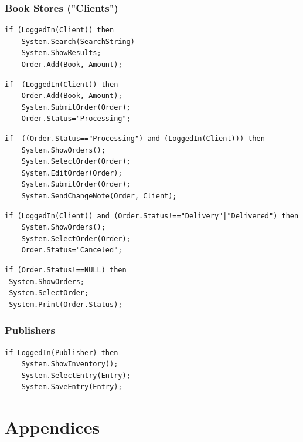 \documentclass[11pt,a4paper,oneside,svgnames]{report}
\begin{document}
\subsection{Book Stores ("Clients")}

\begin{lstlisting}[caption=/PF40/ Search for a Book / Show Catalogue]
 if (LoggedIn(Client)) then
 	System.Search(SearchString)
 	System.ShowResults;
 	Order.Add(Book, Amount);
\end{lstlisting}

\begin{lstlisting}[caption=/PF17/ Book Store Order via Web Interface]
if  (LoggedIn(Client)) then
	Order.Add(Book, Amount);
	System.SubmitOrder(Order);
	Order.Status="Processing";
\end{lstlisting}

\begin{lstlisting}[caption=/PF18/ Change Order]
if  ((Order.Status=="Processing") and (LoggedIn(Client))) then
	System.ShowOrders();
	System.SelectOrder(Order);
	System.EditOrder(Order);
	System.SubmitOrder(Order);
	System.SendChangeNote(Order, Client);
\end{lstlisting}

\begin{lstlisting}[caption=/PF19/ Cancel Order]
if (LoggedIn(Client)) and (Order.Status!=="Delivery"|"Delivered") then
	System.ShowOrders();
	System.SelectOrder(Order);
	Order.Status="Canceled";
\end{lstlisting}

\begin{lstlisting}[caption=/PF50/ Tracking System]
 if (Order.Status!==NULL) then
 System.ShowOrders;
 System.SelectOrder;
 System.Print(Order.Status);
\end{lstlisting}

\subsection{Publishers}

\begin{lstlisting}[caption=/PF60/ Inventory Maintenance]
 if LoggedIn(Publisher) then
 	System.ShowInventory();
 	System.SelectEntry(Entry);
 	System.SaveEntry(Entry);
\end{lstlisting}

\chapter{Appendices}
\printglossaries{}

\listoffigures{}
\listoftables{}
\end{document}
